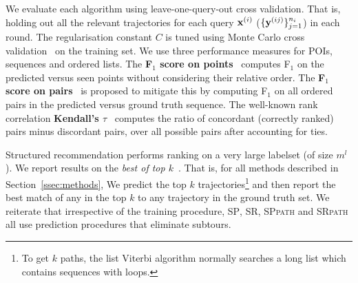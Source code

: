 


We evaluate each algorithm using leave-one-query-out cross validation.
That is, holding out all the relevant trajectories for each query $\mathbf{x}^{({i})}$ (\ie $\{\mathbf{y}^{({ij})}\}_{j=1}^{n_i}$) in each round.
The regularisation constant $C$ is tuned using Monte Carlo cross validation~\cite{burman1989comparative} on the training set.
We use three performance measures for POIs, sequences and ordered lists.
The {\bf F$_1$ score on points}~\cite{ijcai15} computes F$_1$ on the predicted versus seen points
without considering their relative order.
The {\bf F$_1$ score on pairs}~\cite{cikm16paper} is proposed to mitigate this by computing F$_1$ on all ordered pairs in the predicted versus ground truth sequence. %
The well-known rank correlation {\bf Kendall's $\tau$}~\cite{agresti2010analysis}
computes the ratio of concordant (correctly ranked) pairs minus discordant pairs, over all possible pairs after accounting for ties.%

Structured recommendation performs ranking on a very large labelset (of size $m^l$).
We report results on the {\em best of top $k$}~\cite{russakovsky2015imagenet}.
That is, for all methods described in Section~\ref{ssec:methods},
We predict the top $k$ trajectories\footnote{To get $k$ paths, the list Viterbi algorithm normally searches a long list which contains sequences with loops.}
and then report the best match of any in the top $k$ to any trajectory in the ground truth set.
We reiterate that irrespective of the training procedure, \textsc{SP}, \textsc{SR},
\textsc{SPpath} and \textsc{SRpath} all use prediction procedures that eliminate subtours.

